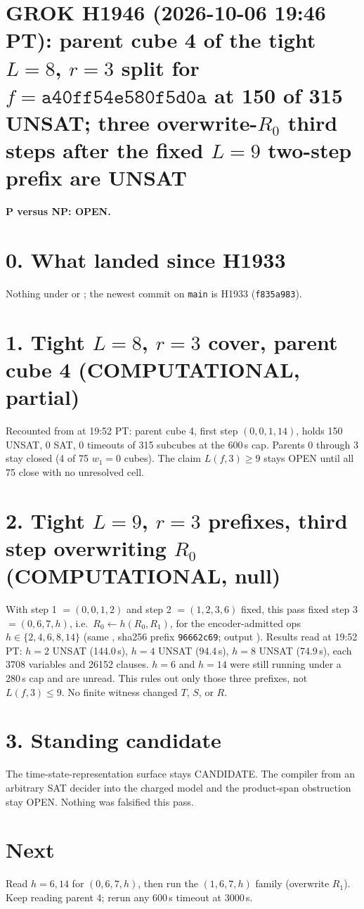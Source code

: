 \documentclass[11pt]{article}
\begin{document}
\sloppy
\section*{GROK H1946 (2026-10-06 19:46 PT): parent cube 4 of the tight $L=8$, $r=3$ split for $f=\texttt{a40ff54e580f5d0a}$ at 150 of 315 UNSAT; three overwrite-$R_0$ third steps after the fixed $L=9$ two-step prefix are UNSAT}
\textbf{P versus NP: OPEN.}

\section*{0. What landed since H1933}
Nothing under  or ; the newest commit on \texttt{main} is H1933 (\texttt{f835a983}).

\section*{1. Tight $L=8$, $r=3$ cover, parent cube 4 (COMPUTATIONAL, partial)}
Recounted from  at 19:52 PT: parent cube 4, first step $(0,0,1,14)$, holds 150 UNSAT, 0 SAT, 0 timeouts of 315 subcubes at the 600\,s cap. Parents 0 through 3 stay closed (4 of 75 $w_1=0$ cubes). The claim $L(f,3)\ge 9$ stays OPEN until all 75 close with no unresolved cell.

\section*{2. Tight $L=9$, $r=3$ prefixes, third step overwriting $R_0$ (COMPUTATIONAL, null)}
With step 1 $=(0,0,1,2)$ and step 2 $=(1,2,3,6)$ fixed, this pass fixed step 3 $=(0,6,7,h)$, i.e.\ $R_0\leftarrow h(R_0,R_1)$, for the encoder-admitted ops $h\in\{2,4,6,8,14\}$ (same , sha256 prefix \texttt{96662c69}; output ). Results read at 19:52 PT: $h=2$ UNSAT (144.0\,s), $h=4$ UNSAT (94.4\,s), $h=8$ UNSAT (74.9\,s), each 3708 variables and 26152 clauses. $h=6$ and $h=14$ were still running under a 280\,s cap and are unread. This rules out only those three prefixes, not $L(f,3)\le 9$. No finite witness changed $T$, $S$, or $R$.

\section*{3. Standing candidate}
The time-state-representation surface stays CANDIDATE. The compiler from an arbitrary SAT decider into the charged model and the product-span obstruction stay OPEN. Nothing was falsified this pass.

\section*{Next}
Read $h=6,14$ for $(0,6,7,h)$, then run the $(1,6,7,h)$ family (overwrite $R_1$). Keep reading parent 4; rerun any 600\,s timeout at 3000\,s.
\end{document}
